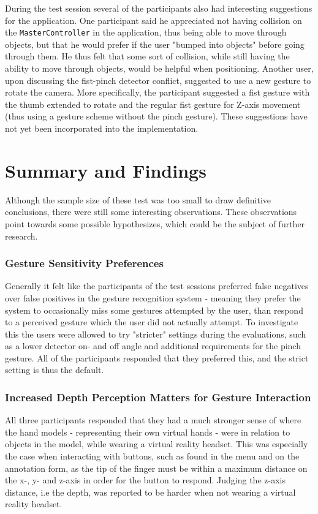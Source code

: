 During the test session several of the participants also had interesting suggestions for the application.
One participant said he appreciated not having collision on the \texttt{MasterController} in the application, thus being able to move through objects, 
but that he would prefer if the user "bumped into objects" before going through them. He thus felt that some sort of collision, while still having the ability to move
through objects, would be helpful when positioning. 
Another user, upon discussing the fist-pinch detector conflict, suggested to use a new gesture to rotate the camera. 
More specifically, the participant suggested a fist gesture with the thumb extended to rotate and the regular fist gesture for Z-axis movement (thus using a gesture
scheme without the pinch gesture). These suggestions have not yet been incorporated into the implementation.




\section{Summary and Findings}
Although the sample size of these test was too small to draw definitive conclusions, there were still some interesting observations.
These observations point towards some possible hypothesizes, which could be the subject of further research.

\subsubsection{Gesture Sensitivity Preferences}
Generally it felt like the participants of the test sessions preferred false negatives over false positives in the gesture recognition system -
meaning they prefer the system to occasionally miss some gestures attempted by the user, than respond to a perceived gesture which the user did not actually attempt.
To investigate this the users were allowed to try "stricter" settings during the evaluations, such as a lower detector on- and off angle and additional requirements for the 
pinch gesture. All of the participants responded that they preferred this, and the strict setting is thus the default. 

\subsubsection{Increased Depth Perception Matters for Gesture Interaction}
All three participants responded that they had a much stronger sense of where the hand models - representing their own virtual hands - were in relation to objects in the model,
while wearing a virtual reality headset. This was especially the case when interacting with buttons, such as found in the menu and on the annotation form, as the tip of the finger
must be within a maximum distance on the x-, y- and z-axis in order for the button to respond. Judging the z-axis distance, i.e the depth, was reported to be harder 
when not wearing a virtual reality headset.  

